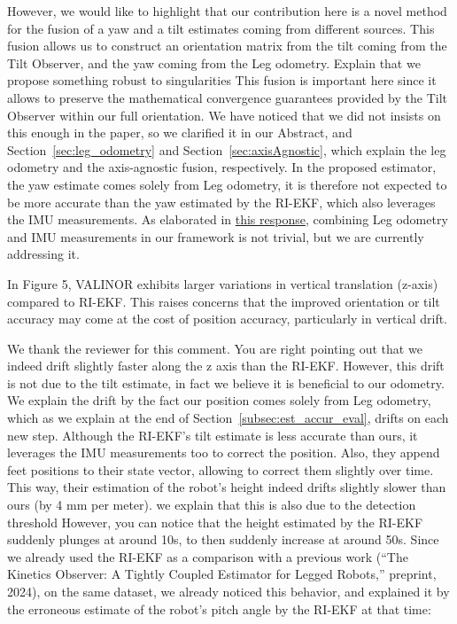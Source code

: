However, we would like to highlight that our contribution here is a novel method for the fusion of a yaw and a tilt estimates coming from different sources. 
This fusion allows us to construct an orientation matrix from the tilt coming from the Tilt Observer, and the yaw coming from the Leg odometry. 
\alert{Explain that we propose something robust to singularities}
This fusion is important here since it allows to preserve the mathematical convergence guarantees provided by the Tilt Observer within our full orientation. 
We have noticed that we did not insists on this enough in the paper, so we clarified it in our Abstract, and Section~\ref{sec:leg_odometry} and Section~\ref{sec:axisAgnostic}, which explain the leg odometry and the axis-agnostic fusion, respectively.
In the proposed estimator, the yaw estimate comes solely from Leg odometry, it is therefore not expected to be more accurate than the yaw estimated by the RI-EKF, which also leverages the IMU measurements. As elaborated in \hyperlink{CommentSe3Fusion}{this response}, combining Leg odometry and IMU measurements in our framework is not trivial, but we are currently addressing it.


\begin{revquote}
In Figure 5, VALINOR exhibits larger variations in vertical translation (z-axis) compared to RI-EKF. This raises concerns that the improved orientation or tilt accuracy may come at the cost of position accuracy, particularly in vertical drift.
\end{revquote}

We thank the reviewer for this comment. You are right pointing out that we indeed drift slightly faster along the z axis than the RI-EKF.
However, this drift is not due to the tilt estimate, in fact we believe it is beneficial to our odometry. 
We explain the drift by the fact our position comes solely from Leg odometry, which as we explain at the end of Section~\ref{subsec:est_accur_eval}, drifts on each new step. Although the RI-EKF's tilt estimate is less accurate than ours, it leverages the IMU measurements too to correct the position. Also, they append feet positions to their state vector, allowing to correct them slightly over time. 
This way, their estimation of the robot's height indeed drifts slightly slower than ours (by 4 mm per meter).  \alert{we explain that this is also due to the detection threshold}
However, you can notice that the height estimated by the RI-EKF suddenly plunges at around 10s, to then suddenly increase at around 50s. Since we already used the RI-EKF as a comparison with a previous work (“The Kinetics Observer: A Tightly Coupled Estimator for Legged Robots,” preprint, 2024), on the same dataset, we already noticed this behavior, and explained it by the erroneous estimate of the robot's pitch angle by the RI-EKF at that time:

